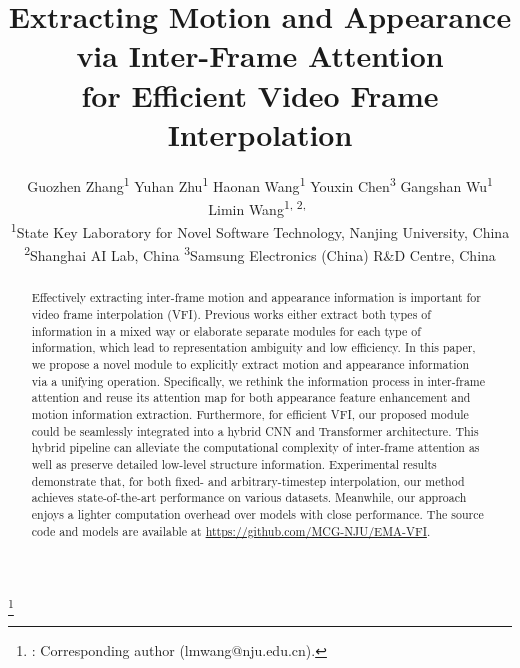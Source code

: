 \documentclass[10pt,twocolumn,letterpaper]{article}
\newcommand\blfootnote[1]{\begingroup
\renewcommand\thefootnote{}\footnote{#1}\addtocounter{footnote}{-1}\endgroup
}
\begin{document}
\title{Extracting Motion and Appearance via Inter-Frame Attention \\for Efficient Video Frame Interpolation}

\author{\hspace{-5.5mm} Guozhen Zhang\textsuperscript{1} \quad Yuhan Zhu\textsuperscript{1} \quad Haonan Wang\textsuperscript{1} \quad  Youxin Chen\textsuperscript{3} \quad  Gangshan Wu\textsuperscript{1} \quad  Limin Wang\textsuperscript{1, 2,~\Letter} \\
\textsuperscript{1}State Key Laboratory for Novel Software Technology, Nanjing University, China \\
\textsuperscript{2}Shanghai AI Lab, China \quad
\textsuperscript{3}Samsung Electronics (China) R\&D Centre, China
}
\maketitle

\begin{abstract}
   Effectively extracting inter-frame motion and appearance information is important for video frame interpolation (VFI). Previous works either extract both types of information in a mixed way or elaborate separate modules for each type of information, which lead to representation ambiguity and low efficiency. In this paper, we propose a novel module to explicitly extract motion and appearance information via a unifying operation. Specifically, we rethink the information process in inter-frame attention and reuse its attention map for both appearance feature enhancement and motion information extraction. Furthermore, for efficient VFI, our proposed module could be seamlessly integrated into a hybrid CNN and Transformer architecture. This hybrid pipeline can alleviate the computational complexity of inter-frame attention as well as preserve detailed low-level structure information. Experimental results demonstrate that, for both fixed- and arbitrary-timestep interpolation, our method achieves state-of-the-art performance on various datasets. Meanwhile, our approach enjoys a lighter computation overhead over models with close performance. The source code and models are available at \url{https://github.com/MCG-NJU/EMA-VFI}.
\end{abstract}
\blfootnote{ \Letter: Corresponding author (lmwang@nju.edu.cn).}
\end{document}
